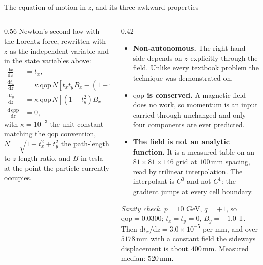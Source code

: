 \documentclass[aspectratio=169,10pt]{beamer}
\newcommand{\mm}{\ensuremath{\,\mathrm{mm}}}
\newcommand{\qop}{\ensuremath{\mathrm{qop}}}
\newcommand{\hl}[1]{{\color{accent}\textbf{#1}}}
\newcommand{\bad}[1]{{\color{warm}\textbf{#1}}}
\begin{document}
\begin{frame}[shrink=25]{The equation of motion in \texorpdfstring{$z$}{z}, and its three awkward properties}
  \vspace{1mm}
  \begin{columns}[T]
    \begin{column}{0.56\textwidth}
      Newton's second law with the Lorentz force, rewritten with $z$ as the
      independent variable and in the state variables above:
      \begin{align*}
        \frac{\mathrm{d}x}{\mathrm{d}z} &= t_x,
          &\frac{\mathrm{d}y}{\mathrm{d}z} &= t_y, \\[2pt]
        \frac{\mathrm{d}t_x}{\mathrm{d}z}
          &= \kappa\,\qop\,N\left[t_x t_y B_x - (1 + t_x^2) B_y + t_y B_z\right], \\[2pt]
        \frac{\mathrm{d}t_y}{\mathrm{d}z}
          &= \kappa\,\qop\,N\left[(1 + t_y^2) B_x - t_x t_y B_y - t_x B_z\right], \\[2pt]
        \frac{\mathrm{d}\,\qop}{\mathrm{d}z} &= 0,
      \end{align*}
      with $\kappa = 10^{-3}$ the unit constant matching the $\qop$ convention,
      $N = \sqrt{1 + t_x^2 + t_y^2}$ the path-length to $z$-length ratio, and
      $B$ in tesla at the point the particle currently occupies.
    \end{column}
    \begin{column}{0.42\textwidth}
      \begin{itemize}\small
        \item \hl{Non-autonomous.} The right-hand side depends on $z$ explicitly
              through the field. Unlike every textbook problem the technique was
              demonstrated on.
        \item \hl{$\qop$ is conserved.} A magnetic field does no work, so
              momentum is an input carried through unchanged and only four
              components are ever predicted.
        \item \bad{The field is not an analytic function.} It is a measured
              table on an $81 \times 81 \times 146$ grid at $100\mm$ spacing,
              read by trilinear interpolation. The interpolant is $C^0$ and not
              $C^1$: the gradient jumps at every cell boundary.
      \end{itemize}
      \smallskip
      {\footnotesize\emph{Sanity check.} $p = 10$ GeV, $q = +1$, so
       $\qop = 0.0300$; $t_x = t_y = 0$, $B_y = -1.0$ T. Then
       $\mathrm{d}t_x/\mathrm{d}z = 3.0\times10^{-5}$ per mm, and over
       $5178\mm$ with a constant field the sideways displacement is about
       $400\mm$. Measured median: $520\mm$.}
    \end{column}
  \end{columns}
\end{frame}
\end{document}
